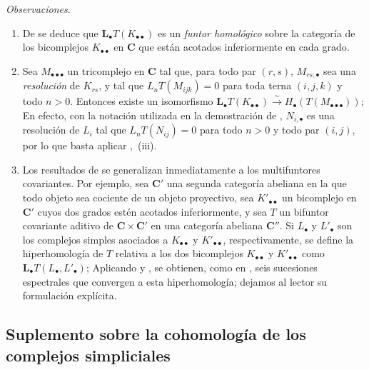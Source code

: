 \begin{remarks}[11.7.3]
\label{0.11.7.3}
\label{0.11.7.3-fr}
\emph{Observaciones}.
\begin{enumerate}
  \item[{\rm(i)}]
  De  se deduce que
  $\mathbf{L}_\bullet T(K_{\bullet\bullet})$ es un \emph{funtor homológico} sobre la
  categoría de los bicomplejos $K_{\bullet\bullet}$ en $\boldsymbol{C}$ que están
  acotados inferiormente en cada grado.

  \item[{\rm(ii)}]
  Sea $M_{\bullet\bullet\bullet}$ un tricomplejo en $\boldsymbol{C}$ tal que,
  para todo par $(r,s)$, $M_{rs,\bullet}$ sea una \emph{resolución} de $K_{rs}$,
  y tal que
  $L_nT(M_{ijk})=0$
  para toda terna $(i,j,k)$ y todo $n>0$.
  Entonces existe un isomorfismo
  $
\mathbf{L}_\bullet T(K_{\bullet\bullet})
\xrightarrow{\sim} H_\bullet(T(M_{\bullet\bullet\bullet}))$;
  En efecto, con la notación utilizada en la demostración de ,
  $N_{i,\bullet}$ es una resolución de $L_i$ tal que
  $L_nT(N_{ij})=0$ para todo $n>0$ y todo par $(i,j)$, por lo que
  basta aplicar ,~(iii).

  \item[{\rm(iii)}]
  Los resultados de  se generalizan inmediatamente a los
  multifuntores covariantes.
  Por ejemplo, sea $\boldsymbol{C}'$ una segunda categoría abeliana en la que todo
  objeto sea cociente de un objeto proyectivo, sea
  $K'_{\bullet\bullet}$ un bicomplejo en $\boldsymbol{C}'$ cuyos dos grados estén
  acotados inferiormente, y sea $T$ un bifuntor covariante aditivo de
  $\boldsymbol{C}\times\boldsymbol{C}'$ en una categoría abeliana $\boldsymbol{C}''$.
  Si $L_\bullet$ y $L'_\bullet$ son los complejos simples asociados a
  $K_{\bullet\bullet}$ y $K'_{\bullet\bullet}$, respectivamente, se define
  la hiperhomología de $T$ relativa a los dos bicomplejos
  $K_{\bullet\bullet}$ y $K'_{\bullet\bullet}$ como
  $\mathbf{L}_\bullet T(L_\bullet,L'_\bullet)$;
  Aplicando  y , se obtienen, como en
  , seis sucesiones espectrales que convergen a esta hiperhomología;
  dejamos al lector su formulación explícita.
\end{enumerate}
\end{remarks}

\subsection{Suplemento sobre la cohomología de los complejos simpliciales}
\label{subsection:0.11.8}
\label{subsection:0.11.8-fr}

